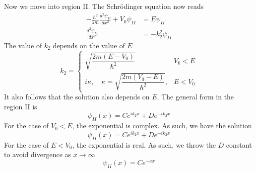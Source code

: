 \documentclass[../../../main.tex]{subfiles}
\begin{document}
Now we move into region II.
The Schrödinger equation now reads
\begin{align*}
    -\frac{\hbar^2}{2m} \frac{d^2 \psi_{II}}{dx^2} + V_0 \psi_{II} & =  E \psi_{II}      \\
    \frac{d^2 \psi_{II}}{dx^2}                                     & = - k_2^2 \psi_{II}
\end{align*}
The value  of $k_2$ depends on the value of $E$
\begin{equation*}
    k_2 =
    \begin{cases}
        \sqrt{\dfrac{2 m (E - V_0)}{\hbar^2}}                           & V_0<E   \\
        i \kappa, \quad \kappa = \sqrt{\dfrac{2 m (V_0 - E)}{\hbar^2}}, & E < V_0
    \end{cases}
\end{equation*}
It also follows that the solution also depends on $E$.
The general form in the region II is
\begin{equation*}
    \psi_{II}(x)=C e^{i k_2 x} + D e^{-i k_2 x}
\end{equation*}
For the case of $V_0<E$, the exponential is complex.
As such, we have the solution
\begin{equation*}
    \psi_{II}(x) = C e^{i k_2 x} + D e^{-i k_2 x}
\end{equation*}
For the case of $E<V_0$, the exponential is real.
As such, we throw the $D$ constant to avoid divergence as $x \rightarrow \infty$
\begin{equation*}
    \psi_{II}(x) =C e^{-\kappa x}
\end{equation*}
\end{document}

